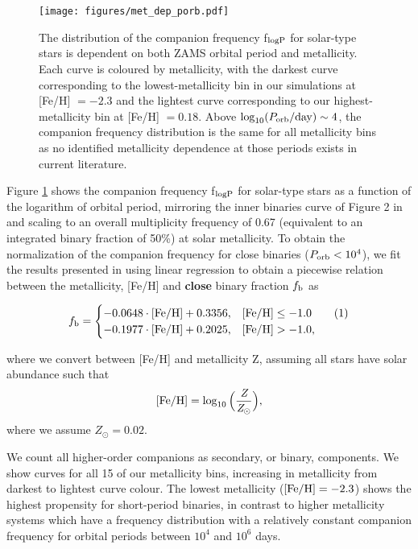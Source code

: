 \documentclass[twocolumn, linenumbers]{aastex631}
\newcommand\numberthis{\addtocounter{equation}{1}\tag{\theequation}}
\begin{document}
\begin{figure}
	\texttt{[image: figures/met\_dep\_porb.pdf]}
    \caption{The distribution of the companion frequency f$_{\rm{logP}}$ 
for solar-type stars is dependent on both ZAMS orbital period and 
metallicity. Each curve is coloured by metallicity, with the darkest curve 
corresponding to the lowest-metallicity bin in our simulations at [Fe/H] 
$=-2.3$ and the lightest curve corresponding to our highest-metallicity 
bin at [Fe/H] $=0.18$. Above $\log_{10}(P_{\rm{orb}}/\rm{day})\sim 4$, the 
companion frequency distribution is the same for all metallicity bins as 
no identified metallicity dependence at those periods exists in current 
literature.}
    \label{fig:met_dep_porb}
\end{figure}

Figure \ref{fig:met_dep_porb} shows the companion frequency 
f$_{\rm{logP}}$ for solar-type stars as a function of the logarithm of 
orbital period, mirroring the inner binaries curve of Figure 2 in 
\citet{Moe2021} and scaling to an overall multiplicity frequency of 0.67 
(equivalent to an integrated binary fraction of 50\%) at solar 
metallicity. To obtain the normalization of the companion frequency for 
close binaries ($P_{\rm{orb}}<10^4$), we fit the results presented in 
\citet{Moe2019} using linear regression to obtain a piecewise relation 
between the metallicity, [Fe/H] and \textbf{close} binary fraction 
$f_{\rm{b}}$ as

\[f_{\rm{b}}= \begin{cases} 
      - 0.0648 \cdot [\rm{Fe/H}] + 0.3356, & [\rm{Fe/H}]\leq -1.0 
\numberthis \\
      -0.1977 \cdot [\rm{Fe/H}] + 0.2025, & [\rm{Fe/H}]> -1.0  , 
   \end{cases}
\]

\noindent where we convert between [Fe/H] and metallicity Z, assuming all 
stars have solar abundance such that
\begin{equation}
\label{eq:metallicity}
    [\rm{Fe/H}] = 
\log_{10}\Big(\frac{\textit{Z}}{\textit{Z}_{\odot}}\Big),
\end{equation}
\noindent where we assume $Z_{\odot}=0.02$.

We count all higher-order companions as secondary, or binary, components. 
We show curves for all 15 of our metallicity bins, increasing in 
metallicity from darkest to lightest curve colour. The lowest metallicity 
($\rm{[Fe/H]}=-2.3$) shows the highest propensity for short-period 
binaries, in contrast to higher metallicity systems which have a frequency 
distribution with a relatively constant companion frequency for orbital 
periods between $10^4$ and $10^6$ days.
\end{document}
